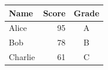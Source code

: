 \begin{tabular}{lrc}
\toprule
Name & Score & Grade \\
\midrule
Alice & 95 & A \\
Bob & 78 & B \\
Charlie & 61 & C \\
\bottomrule
\end{tabular}

